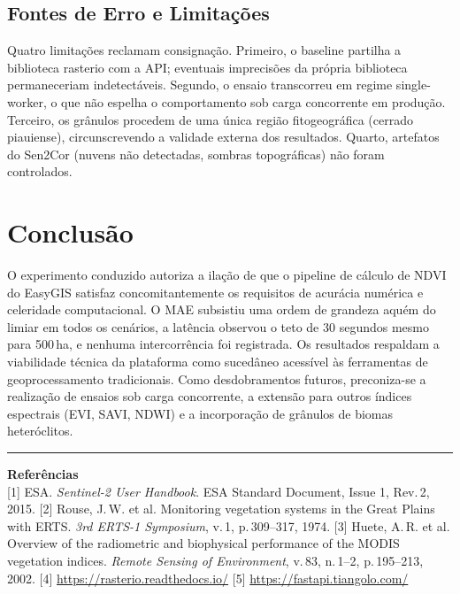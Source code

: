 \documentclass[10pt, a4paper]{article}
\begin{document}
\subsection{Fontes de Erro e Limitações}

Quatro limitações reclamam consignação. Primeiro, o baseline partilha a biblioteca rasterio com a API; eventuais imprecisões da própria biblioteca permaneceriam indetectáveis. Segundo, o ensaio transcorreu em regime single-worker, o que não espelha o comportamento sob carga concorrente em produção. Terceiro, os grânulos procedem de uma única região fitogeográfica (cerrado piauiense), circunscrevendo a validade externa dos resultados. Quarto, artefatos do Sen2Cor (nuvens não detectadas, sombras topográficas) não foram controlados.

\section{Conclusão}

O experimento conduzido autoriza a ilação de que o pipeline de cálculo de NDVI do EasyGIS satisfaz concomitantemente os requisitos de acurácia numérica e celeridade computacional. O MAE subsistiu uma ordem de grandeza aquém do limiar em todos os cenários, a latência observou o teto de 30 segundos mesmo para 500\,ha, e nenhuma intercorrência foi registrada. Os resultados respaldam a viabilidade técnica da plataforma como sucedâneo acessível às ferramentas de geoprocessamento tradicionais. Como desdobramentos futuros, preconiza-se a realização de ensaios sob carga concorrente, a extensão para outros índices espectrais (EVI, SAVI, NDWI) e a incorporação de grânulos de biomas heteróclitos.

\vspace{6pt}\hrule\vspace{6pt}
{\small\textbf{Referências}\\[4pt]
{[1]} ESA. \textit{Sentinel-2 User Handbook}. ESA Standard Document, Issue 1, Rev.\,2, 2015.\quad
{[2]} Rouse, J.\,W. et al. Monitoring vegetation systems in the Great Plains with ERTS. \textit{3rd ERTS-1 Symposium}, v.\,1, p.\,309--317, 1974.\quad
{[3]} Huete, A.\,R. et al. Overview of the radiometric and biophysical performance of the MODIS vegetation indices. \textit{Remote Sensing of Environment}, v.\,83, n.\,1--2, p.\,195--213, 2002.\quad
{[4]} \url{https://rasterio.readthedocs.io/}\quad
{[5]} \url{https://fastapi.tiangolo.com/}}
\end{document}
